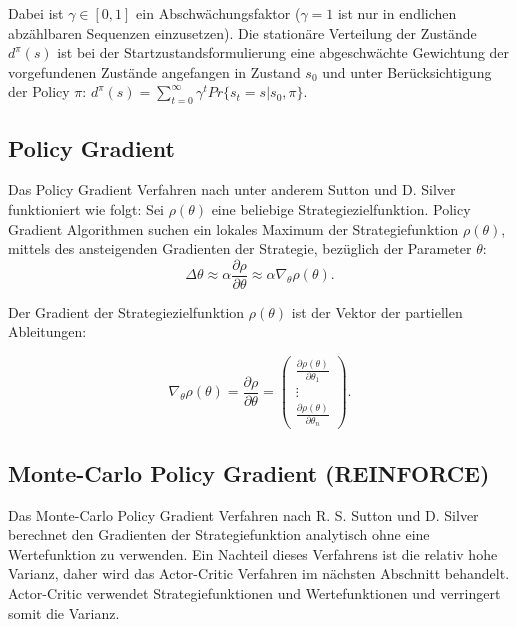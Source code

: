 \documentclass[conference]{IEEEtran}
\begin{document}
Dabei ist $\gamma \in [0,1]$ ein Abschwächungsfaktor ($\gamma = 1$ ist nur in endlichen abzählbaren Sequenzen einzusetzen). Die stationäre Verteilung der Zustände $d^\pi (s)$ ist bei der Startzustandsformulierung eine abgeschwächte Gewichtung der vorgefundenen Zustände angefangen in Zustand $s_0$ und unter Berücksichtigung der Policy $\pi$: $d^\pi (s) = \sum^\infty_{t=0} \gamma^t Pr \{s_t = s | s_0, \pi\}$.
 
\subsection{Policy Gradient}
Das Policy Gradient Verfahren nach unter anderem Sutton \cite{sutton_99} und D. Silver \cite{silver_15} funktioniert wie folgt:
Sei $\rho(\theta)$ eine beliebige Strategiezielfunktion. Policy Gradient Algorithmen suchen ein lokales Maximum der Strategiefunktion $\rho(\theta)$, mittels des ansteigenden Gradienten der Strategie, bezüglich der Parameter $\theta$:   
\begin{equation*}
\Delta \theta \approx \alpha \frac{\partial \rho}{\partial \theta} \approx \alpha \nabla_\theta \rho(\theta).
\end{equation*}

Der Gradient der Strategiezielfunktion $\rho(\theta)$ ist der Vektor der partiellen Ableitungen:

\begin{equation}
\nabla_\theta \rho(\theta) = \frac{\partial \rho}{\partial \theta} =
\begin{pmatrix}
\frac{\partial \rho(\theta)}{\partial \theta_1} \\ 
\vdots \\
\frac{\partial \rho(\theta)}{\partial \theta_n}
\end{pmatrix}.
\end{equation}

\subsection{Monte-Carlo Policy Gradient (REINFORCE)}
Das Monte-Carlo Policy Gradient Verfahren nach R. S. Sutton \cite{sutton_99} und D. Silver \cite{silver_15} berechnet den Gradienten der Strategiefunktion analytisch ohne eine Wertefunktion zu verwenden. Ein Nachteil dieses Verfahrens ist die relativ hohe Varianz, daher wird das Actor-Critic Verfahren im nächsten Abschnitt behandelt. Actor-Critic verwendet Strategiefunktionen und Wertefunktionen und verringert somit die Varianz. 
\end{document}
